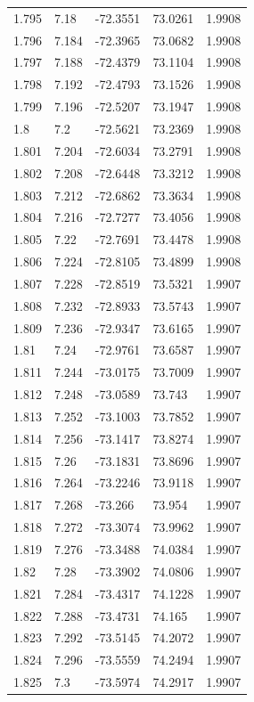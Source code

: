 \begin{tabular}{lllll}
1.795 & 7.18 & -72.3551 & 73.0261 & 1.9908 \\
1.796 & 7.184 & -72.3965 & 73.0682 & 1.9908 \\
1.797 & 7.188 & -72.4379 & 73.1104 & 1.9908 \\
1.798 & 7.192 & -72.4793 & 73.1526 & 1.9908 \\
1.799 & 7.196 & -72.5207 & 73.1947 & 1.9908 \\
1.8 & 7.2 & -72.5621 & 73.2369 & 1.9908 \\
1.801 & 7.204 & -72.6034 & 73.2791 & 1.9908 \\
1.802 & 7.208 & -72.6448 & 73.3212 & 1.9908 \\
1.803 & 7.212 & -72.6862 & 73.3634 & 1.9908 \\
1.804 & 7.216 & -72.7277 & 73.4056 & 1.9908 \\
1.805 & 7.22 & -72.7691 & 73.4478 & 1.9908 \\
1.806 & 7.224 & -72.8105 & 73.4899 & 1.9908 \\
1.807 & 7.228 & -72.8519 & 73.5321 & 1.9907 \\
1.808 & 7.232 & -72.8933 & 73.5743 & 1.9907 \\
1.809 & 7.236 & -72.9347 & 73.6165 & 1.9907 \\
1.81 & 7.24 & -72.9761 & 73.6587 & 1.9907 \\
1.811 & 7.244 & -73.0175 & 73.7009 & 1.9907 \\
1.812 & 7.248 & -73.0589 & 73.743 & 1.9907 \\
1.813 & 7.252 & -73.1003 & 73.7852 & 1.9907 \\
1.814 & 7.256 & -73.1417 & 73.8274 & 1.9907 \\
1.815 & 7.26 & -73.1831 & 73.8696 & 1.9907 \\
1.816 & 7.264 & -73.2246 & 73.9118 & 1.9907 \\
1.817 & 7.268 & -73.266 & 73.954 & 1.9907 \\
1.818 & 7.272 & -73.3074 & 73.9962 & 1.9907 \\
1.819 & 7.276 & -73.3488 & 74.0384 & 1.9907 \\
1.82 & 7.28 & -73.3902 & 74.0806 & 1.9907 \\
1.821 & 7.284 & -73.4317 & 74.1228 & 1.9907 \\
1.822 & 7.288 & -73.4731 & 74.165 & 1.9907 \\
1.823 & 7.292 & -73.5145 & 74.2072 & 1.9907 \\
1.824 & 7.296 & -73.5559 & 74.2494 & 1.9907 \\
1.825 & 7.3 & -73.5974 & 74.2917 & 1.9907 \\

\end{tabular}
